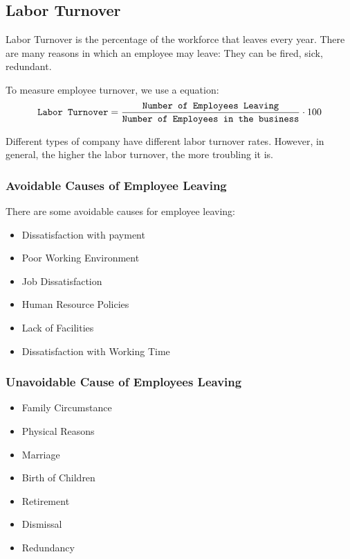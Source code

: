 \documentclass{standalone}
\begin{document}
\subsection{Labor Turnover}\label{LaborTurnover}
Labor Turnover is the percentage of the workforce that leaves every year.
There are many reasons in which an employee may leave:
They can be fired, sick, redundant.

To measure employee turnover, we use a equation:
\begin{equation}
	\texttt{Labor Turnover} = \frac{\texttt{Number of Employees Leaving}}{ \texttt{Number of Employees in the business} } \cdot 100 \\
\end{equation}

Different types of company have different labor turnover rates. 
However, in general, the higher the labor turnover, the more troubling it is.

\subsubsection{Avoidable Causes of Employee Leaving}
There are some avoidable causes for employee leaving:
\begin{itemize}
	\item Dissatisfaction with payment
	\item Poor Working Environment
	\item Job Dissatisfaction
	\item Human Resource Policies
	\item Lack of Facilities
	\item Dissatisfaction with Working Time
\end{itemize}

\subsubsection{Unavoidable Cause of Employees Leaving}
\begin{itemize}
	\item Family Circumstance
	\item Physical Reasons
	\item Marriage
	\item Birth of Children
	\item Retirement
	\item Dismissal
	\item Redundancy
\end{itemize}
\end{document}
